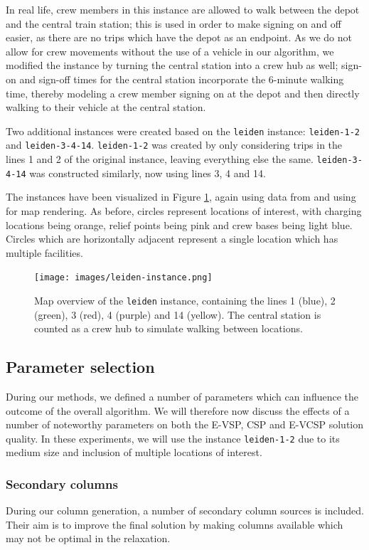 \documentclass[]{article}
\begin{document}
In real life, crew members in this instance are allowed to walk between the depot and the central train station; this is used in order to make signing on and off easier, as there are no trips which have the depot as an endpoint. As we do not allow for crew movements without the use of a vehicle in our algorithm, we modified the instance by turning the central station into a crew hub as well; sign-on and sign-off times for the central station incorporate the 6-minute walking time, thereby modeling a crew member signing on at the depot and then directly walking to their vehicle at the central station. 

Two additional instances were created based on the \texttt{leiden} instance: \texttt{leiden-1-2} and \texttt{leiden-3-4-14}. \texttt{leiden-1-2} was created by only considering trips in the lines 1 and 2 of the original instance, leaving everything else the same. \texttt{leiden-3-4-14} was constructed similarly, now using lines 3, 4 and 14.

The instances have been visualized in Figure \ref{fig:leiden-map}, again using data from \citet{OpenStreetMap2025} and using \citet{QGIS2025} for map rendering. As before, circles represent locations of interest, with charging locations being orange, relief points being pink and crew bases being light blue. Circles which are horizontally adjacent represent a single location which has multiple facilities.

\begin{figure}[h]
  \centering
  \texttt{[image: images/leiden-instance.png]}
  \caption{Map overview of the \texttt{leiden} instance, containing the lines 1 (blue), 2 (green), 3 (red), 4 (purple) and 14 (yellow). The central station is counted as a crew hub to simulate walking between locations.}
  \label{fig:leiden-map}
\end{figure}

\subsection{Parameter selection}
During our methods, we defined a number of parameters which can influence the outcome of the overall algorithm. We will therefore now discuss the effects of a number of noteworthy parameters on both the E-VSP, CSP and E-VCSP solution quality. In these experiments, we will use the instance \texttt{leiden-1-2} due to its medium size and inclusion of multiple locations of interest.  

\subsubsection{Secondary columns}
During our column generation, a number of secondary column sources is included. Their aim is to improve the final solution by making columns available which may not be optimal in the relaxation. 
\end{document}
